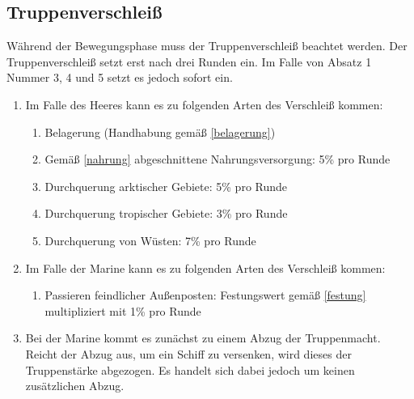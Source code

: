 \documentclass{article}
\begin{document}
\subsection{Truppenverschleiß}
Während der Bewegungsphase muss der Truppenverschleiß beachtet werden. Der Truppenverschleiß setzt erst nach drei Runden ein. Im Falle von Absatz 1 Nummer 3, 4 und 5 setzt es jedoch sofort ein.
\begin{enumerate}[(1)]
	\item Im Falle des Heeres kann es zu folgenden Arten des Verschleiß kommen:
	\begin{enumerate}[1.]
		\item Belagerung (Handhabung gemäß \ref{belagerung})
		\item Gemäß \ref{nahrung} abgeschnittene Nahrungsversorgung: 5\% pro Runde
		\item Durchquerung arktischer Gebiete: 5\% pro Runde
		\item Durchquerung tropischer Gebiete: 3\% pro Runde
		\item Durchquerung von Wüsten: 7\% pro Runde
	\end{enumerate}
	\item Im Falle der Marine kann es zu folgenden Arten des Verschleiß kommen:
	\begin{enumerate}[1.]
		\item Passieren feindlicher Außenposten: Festungswert gemäß \ref{festung} multipliziert mit 1\% pro Runde
	\end{enumerate}
	\item Bei der Marine kommt es zunächst zu einem Abzug der Truppenmacht. Reicht der Abzug aus, um ein Schiff zu versenken, wird dieses der Truppenstärke abgezogen. Es handelt sich dabei jedoch um keinen zusätzlichen Abzug.
\end{enumerate}
\end{document}
